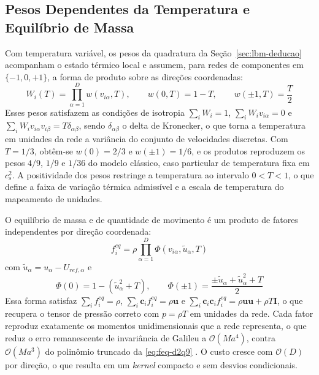 
\subsection{Pesos Dependentes da Temperatura e Equilíbrio de Massa}\label{subsec:lbm-equilibrio-f}

Com temperatura variável, os pesos da quadratura da Seção~\ref{sec:lbm-deducao} acompanham o estado térmico local e assumem, para redes de componentes em $\{-1, 0, +1\}$, a forma de produto sobre as direções coordenadas:
\begin{equation}\label{eq:pesos-temperatura}
    W_i(T) = \prod_{\alpha=1}^{D} w(v_{i\alpha}, T), \qquad w(0, T) = 1 - T, \qquad w(\pm 1, T) = \frac{T}{2}
\end{equation}
Esses pesos satisfazem as condições de isotropia $\sum_i W_i = 1$, $\sum_i W_i v_{i\alpha} = 0$ e $\sum_i W_i v_{i\alpha} v_{i\beta} = T \delta_{\alpha\beta}$, sendo $\delta_{\alpha\beta}$ o delta de Kronecker, o que torna a temperatura em unidades da rede a variância do conjunto de velocidades discretas.
Com $T = 1/3$, obtêm-se $w(0) = 2/3$ e $w(\pm 1) = 1/6$, e os produtos reproduzem os pesos $4/9$, $1/9$ e $1/36$ do modelo clássico, caso particular de temperatura fixa em $c_s^2$.
A positividade dos pesos restringe a temperatura ao intervalo $0 < T < 1$, o que define a faixa de variação térmica admissível e a escala de temperatura do mapeamento de unidades.

O equilíbrio de massa e de quantidade de movimento é um produto de fatores independentes por direção coordenada:
\begin{equation}\label{eq:feq-produto}
    f_i^{eq} = \rho \prod_{\alpha=1}^{D} \Phi(v_{i\alpha}, \tilde{u}_\alpha, T)
\end{equation}
com $\tilde{u}_\alpha = u_\alpha - U_{ref,\alpha}$ e
\begin{equation}\label{eq:feq-fatores}
    \Phi(0) = 1 - \left( \tilde{u}_\alpha^2 + T \right), \qquad
    \Phi(\pm 1) = \frac{\pm \tilde{u}_\alpha + \tilde{u}_\alpha^2 + T}{2}
\end{equation}
Essa forma satisfaz $\sum_i f_i^{eq} = \rho$, $\sum_i \mathbf{c}_i f_i^{eq} = \rho \mathbf{u}$ e $\sum_i \mathbf{c}_i \mathbf{c}_i f_i^{eq} = \rho \mathbf{u}\mathbf{u} + \rho T \mathbf{I}$, o que recupera o tensor de pressão correto com $p = \rho T$ em unidades da rede.
Cada fator reproduz exatamente os momentos unidimensionais que a rede representa, o que reduz o erro remanescente de invariância de Galileu a $\mathcal{O}(Ma^4)$, contra $\mathcal{O}(Ma^3)$ do polinômio truncado da \eqref{eq:feq-d2q9} \parencite{Tran2022}.
O custo cresce com $\mathcal{O}(D)$ por direção, o que resulta em um \textit{kernel} compacto e sem desvios condicionais.

